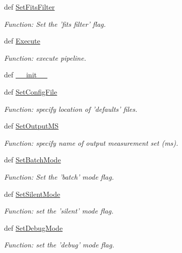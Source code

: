 \begin{DoxyCompactItemize}
def \hyperlink{class_pipeline_1_1_pipeline_aea681f505e21deef324bb10d9866a137}{\-Set\-Fits\-Filter}
\begin{DoxyCompactList}\small\item\em \-Function\-: \-Set the 'fits filter' flag. \end{DoxyCompactList}\item 
def \hyperlink{class_pipeline_1_1_pipeline_aebb8b640e2cdf9ace841c24b594c359e}{\-Execute}
\begin{DoxyCompactList}\small\item\em \-Function\-: execute pipeline. \end{DoxyCompactList}\item 
def \hyperlink{class_pipeline_1_1_pipeline_a9471fe47c5f99217c0696e6eb828c2ea}{\-\_\-\-\_\-init\-\_\-\-\_\-}
\item 
def \hyperlink{class_pipeline_1_1_pipeline_ad0e2d0768b23a2d2d5e154d696a21317}{\-Set\-Config\-File}
\begin{DoxyCompactList}\small\item\em \-Function\-: specify location of 'defaults' files. \end{DoxyCompactList}\item 
def \hyperlink{class_pipeline_1_1_pipeline_ae7cf9ea05d1826f97fda959c4eeae10a}{\-Set\-Output\-M\-S}
\begin{DoxyCompactList}\small\item\em \-Function\-: specify name of output measurement set (ms). \end{DoxyCompactList}\item 
def \hyperlink{class_pipeline_1_1_pipeline_a138f65f6617383b8758831b33ea42442}{\-Set\-Batch\-Mode}
\begin{DoxyCompactList}\small\item\em \-Function\-: \-Set the 'batch' mode flag. \end{DoxyCompactList}\item 
def \hyperlink{class_pipeline_1_1_pipeline_a762dfb493445bcfc9c1e44f8a93f7400}{\-Set\-Silent\-Mode}
\begin{DoxyCompactList}\small\item\em \-Function\-: set the 'silent' mode flag. \end{DoxyCompactList}\item 
def \hyperlink{class_pipeline_1_1_pipeline_adb78acb8c9e486e7eb6a7e830140efe1}{\-Set\-Debug\-Mode}
\begin{DoxyCompactList}\small\item\em \-Function\-: set the 'debug' mode flag. \end{DoxyCompactList}\item 

\end{DoxyCompactItemize}
